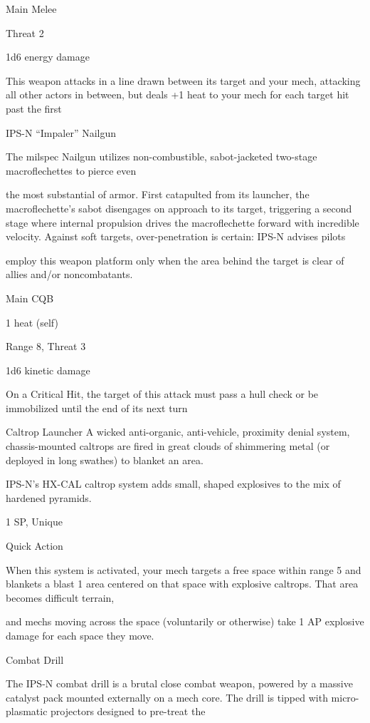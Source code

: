 Main Melee

Threat 2

1d6 energy damage

This weapon attacks in a line drawn between its target and your mech, attacking all other actors
in between, but deals +1 heat to your mech for each target hit past the first


IPS-N “Impaler” Nailgun

The milspec Nailgun utilizes non-combustible, sabot-jacketed two-stage macroflechettes to pierce even

the most substantial of armor. First catapulted from its launcher, the macroflechette’s sabot disengages on
approach to its target, triggering a second stage where internal propulsion drives the macroflechette
forward with incredible velocity. Against soft targets, over-penetration is certain: IPS-N advises pilots

employ this weapon platform only when the area behind the target is clear of allies and/or noncombatants.

Main CQB

1 heat (self)

Range 8, Threat 3

1d6 kinetic damage

On a Critical Hit, the target of this attack must pass a hull check or be immobilized until the end
of its next turn


Caltrop Launcher
A wicked anti-organic, anti-vehicle, proximity denial system, chassis-mounted caltrops are fired in great
clouds of shimmering metal (or deployed in long swathes) to blanket an area.

IPS-N’s HX-CAL caltrop system adds small, shaped explosives to the mix of hardened pyramids.

1 SP, Unique

Quick Action

When this system is activated, your mech targets a free space within range 5 and blankets a
blast 1 area centered on that space with explosive caltrops. That area becomes difficult terrain,




and mechs moving across the space (voluntarily or otherwise) take 1 AP explosive damage for
each space they move.


Combat Drill

The IPS-N combat drill is a brutal close combat weapon, powered by a massive catalyst pack mounted
externally on a mech core. The drill is tipped with micro-plasmatic projectors designed to pre-treat the

